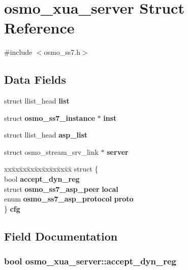 \section{osmo\+\_\+xua\+\_\+server Struct Reference}
\label{structosmo__xua__server}


{\ttfamily \#include $<$osmo\+\_\+ss7.\+h$>$}

\subsection*{Data Fields}
\begin{DoxyCompactItemize}
\item 
struct llist\+\_\+head {\bf list}
\item 
struct {\bf osmo\+\_\+ss7\+\_\+instance} $\ast$ {\bf inst}
\item 
struct llist\+\_\+head {\bf asp\+\_\+list}
\item 
struct osmo\+\_\+stream\+\_\+srv\+\_\+link $\ast$ {\bf server}
\item 
\begin{tabbing}
xx\=xx\=xx\=xx\=xx\=xx\=xx\=xx\=xx\=\kill
struct \{\\
\>bool {\bf accept\_dyn\_reg}\\
\>struct {\bf osmo\_ss7\_asp\_peer} {\bf local}\\
\>enum {\bf osmo\_ss7\_asp\_protocol} {\bf proto}\\
\} {\bf cfg}\\

\end{tabbing}\end{DoxyCompactItemize}


\subsection{Field Documentation}
\subsubsection[{accept\+\_\+dyn\+\_\+reg}]{\setlength{\rightskip}{0pt plus 5cm}bool osmo\+\_\+xua\+\_\+server\+::accept\+\_\+dyn\+\_\+reg}\label{structosmo__xua__server_a9d4bb306794ea75ad02baa42546726eb}


